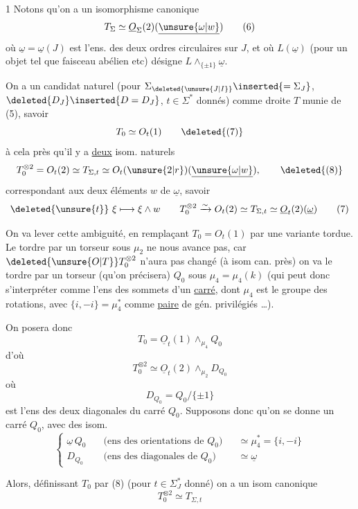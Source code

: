 1 \quad Notons qu'on a un isomorphisme canonique
\[
T_\Sigma\simeq\underline O_\Sigma(2)(\underline{\unsure{\omega|w}}) \tag*{(6)}
\]
où $\underline\omega=\underline\omega(J)$ est l'ens. des deux ordres circulaires sur $J$, et où $L(\underline\omega)$ (pour un objet tel que faisceau abélien etc) désigne $L\wedge_{\{\pm1\}}\underline\omega$.

On a un candidat naturel (pour $\Sigma_{\deleted{\unsure{J|I}}}\inserted{=\Sigma_J}$, $\deleted{D_J}\inserted{D=D_J}$, $t\in\Sigma^\ast$ donnés) comme droite $T$ munie de (5), savoir
\[
T_0\simeq O_t(1) \tag*{\deleted{(7)}}
\]
à cela près qu'il y a \uline{deux} isom. naturels
\[
T_0^{\otimes2}=O_t(2)\simeq T_{\Sigma,t}\simeq O_t(\unsure{2|r})(\underline{\unsure{\omega|w}}),\tag*{\deleted{(8)}}
\]
correspondant aux deux éléments $w$ de $\underline\omega$, savoir
\[
\deleted{\unsure{t}}\ \xi\longmapsto\xi\wedge w \qquad
T_0^{\otimes2}\xrightarrow{\sim}O_t(2)\simeq T_{\Sigma,t}\simeq\underline O_t(2)(\underline\omega) \tag*{(7)}
\]

On va lever cette ambiguité, en remplaçant $T_0=O_t(1)$ par une variante tordue. Le tordre par un torseur sous $\mu_2$  ne nous avance pas, car $\deleted{\unsure{O|T}}T_0^{\otimes2}$ n'aura pas changé (à isom can. près) on va le tordre par un torseur (qu'on précisera) $Q_0$ sous $\mu_4=\mu_4(k)$ (qui peut donc s'interpréter comme l'ens des sommets d'un \uline{carré}, dont $\mu_4$ est le groupe des rotations, avec $\{i,-i\}=\mu_4^\ast$ comme \uline{paire} de gén. privilégiés \ldots).

On posera donc
\[
T_0=\underline O_t(1)\wedge_{\mu_4}Q_0 \tag*{(8)}
\]
d'où
\[
T_0^{\otimes2}\simeq\underline O_t(2)\wedge_{\mu_2}D_{Q_0} \tag*{(9)}
\]
où
\[
D_{Q_0}=Q_0/\{\pm1\} \tag*{(10)}
\]
est l'ens des deux diagonales du carré $Q_0$. Supposons donc qu'on se donne un carré  $Q_0$, avec des isom. 
\[
\left\{\begin{aligned}
\underline\omega\,Q_0\quad &\text{(ens des orientations de $Q_0$)} &&\simeq\mu_4^\ast=\{i,-i\}\\
D_{Q_0}\quad &\text{(ens des diagonales de $Q_0$)} &&\simeq\underline\omega
\end{aligned}\right. \tag*{(11)}
\]

Alors, définissant $T_0$ par (8) (pour $t\in\Sigma_{J}^\ast$ donné) on a un isom canonique
\[
T_0^{\otimes2}\simeq T_{\Sigma,t}\tag*{(12)}
\]

